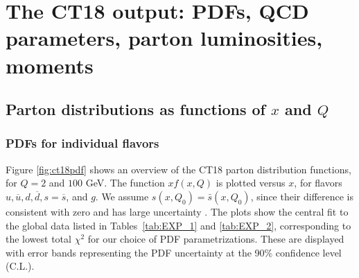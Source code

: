 \section{The CT18 output: PDFs, QCD parameters, parton luminosities, moments}
\label{sec:OverviewCT18} 

\subsection{Parton distributions as functions of $x$ and $Q$}
\subsubsection{PDFs for individual flavors}
Figure \ref{fig:ct18pdf} shows an overview of the CT18 parton
distribution functions, for $Q = 2$ and $100$ GeV.
The function $x f(x,Q)$ is plotted versus $x$, for flavors $u,
\overline{u}, d, \overline{d}, s = \overline{s}$, and $g$.
We assume $s(x,Q_0)=\bar s(x,Q_0)$, since their difference is
consistent with zero and has large uncertainty \cite{Lai:2007dq}.
The plots show the central fit to the global data listed
in Tables~\ref{tab:EXP_1} and \ref{tab:EXP_2}, corresponding to the
lowest total $\chi^2$ for our choice of PDF parametrizations. These
are displayed with error bands representing the PDF uncertainty at
the 90\% confidence level (C.L.).
%
